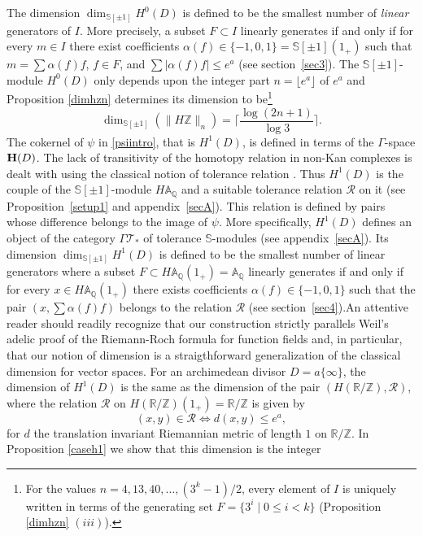 \documentclass[cupthm]{CUP-JNL-JMJ}
\numberwithin{equation}{section}
\theoremstyle{cupplain}
\theoremstyle{cupdefinition}
\theoremstyle{cupremark}
\theoremstyle{cupproof}
\def\A{{\mathbb A}}
\def\Q{{\mathbb Q}}
\def\R{{\mathbb R}}
\def\S{{\mathbb S}}
\def\Z{{\mathbb Z}}
\def\cR{{\mathcal R}}
\def\cT{{\mathcal T}}
\def\bfh{{\bf H}}
\def\sss{{\S}}
\def\spm{{\sss[\pm 1]}}
\begin{document}
The dimension $\dim_{\spm}H^0(D)$ is  defined to be the smallest number of \emph{linear} generators of $I$. More precisely, a subset $F\subset I$ linearly generates if and only if for every $m\in I$ there exist coefficients $\alpha(f)\in \{-1,0,1\}=\spm(1_+)$ such that $m=\sum \alpha(f)f$, $f\in F$, and $\sum \vert\alpha(f)f\vert\leq e^a$ (see section~\ref{sec3}). The $\spm$-module $H^0(D)$  only depends upon the integer part $n=\lfloor e^a\rfloor$ of $e^a$ and Proposition \ref{dimhzn} determines its dimension to be\footnote{For the  values $n=4,13,40,\ldots, (3^k-1)/2$, every element of $I$ is uniquely written in terms of the generating set $F=\{3^i\mid 0\leq i<k\}$ (Proposition \ref{dimhzn} $(iii)$).}
\begin{equation}\label{dimhznintro}
\dim_{\spm}(\| H\Z\|_n)=\bigg\lceil \frac{\log(2n+1)}{\log 3}\bigg\rceil.
\end{equation}
The cokernel of $\psi$ in \eqref{psiintro}, that is $H^1(D)$, is defined in terms of the $\Gamma$-space $\bfh(D)$. The lack of transitivity of the homotopy relation in non-Kan complexes is dealt with using the classical notion of tolerance relation \cite{P}. Thus $H^1(D)$ is  the couple of the $\spm$-module $H\A_\Q$ and a suitable tolerance relation $\cR$ on it (see  Proposition~\ref{setup1} and  appendix~\ref{secA}). This relation is defined by pairs whose difference belongs to the image of $\psi$. More specifically, $H^1(D)$ defines an object of the category $\Gamma\cT_*$ of tolerance $\sss$-modules (see appendix~\ref{secA}). Its dimension $\dim_{\spm}H^1(D)$ is defined to be the smallest number of linear generators  where a subset $F\subset H\A_\Q(1_+)=\A_\Q$ linearly generates if and only if for every $x\in H\A_\Q(1_+)$ there exists coefficients $\alpha(f)\in \{-1,0,1\}$ such that the pair $(x,\sum \alpha(f)f)$ belongs to the relation $\cR$ (see section~\ref{sec4}).\newline An attentive reader  should readily recognize  that our construction strictly parallels Weil's adelic proof of the Riemann-Roch formula for function fields and, in particular, that our notion of dimension  is a straigthforward generalization of the classical dimension for vector spaces.   For an archimedean divisor  $D=a\{\infty\}$, the dimension of $H^1(D)$ is the same as the dimension of the pair $(H(\R/\Z),\cR)$, where the relation $\cR$ on $H(\R/\Z)(1_+)=\R/\Z$ is given by
 \begin{equation}\label{tolerrelat}
(x,y)\in \cR \iff d(x,y)\leq e^a,
\end{equation}
 for $d$ the translation invariant Riemannian metric of length $1$ on $\R/\Z$.  In Proposition \ref{caseh1} we show that this dimension is the integer 
\end{document}
